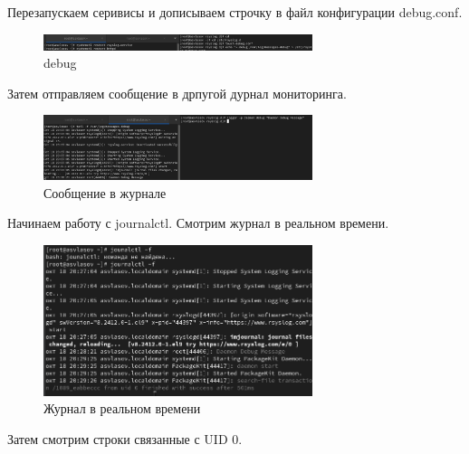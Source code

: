 \documentclass[
  12pt,
  a4paper,
  DIV=11,
  numbers=noendperiod]{scrreprt}
\begin{document}
Перезапускаем серивисы и дописываем строчку в файл конфигурации
debug.conf.

\begin{figure}

{\centering \includegraphics[width=0.7\textwidth,height=\textheight]{image/8.png}

}

\caption{debug}

\end{figure}%

Затем отправляем сообщение в дрпугой дурнал мониторинга.

\begin{figure}

{\centering \includegraphics[width=0.7\textwidth,height=\textheight]{image/9.png}

}

\caption{Сообщение в журнале}

\end{figure}%

Начинаем работу с journalctl. Смотрим журнал в реальном времени.

\begin{figure}

{\centering \includegraphics[width=0.7\textwidth,height=\textheight]{image/10.png}

}

\caption{Журнал в реальном времени}

\end{figure}%

Затем смотрим строки связанные с UID 0.
\end{document}

